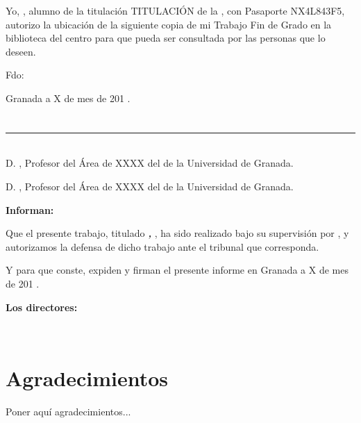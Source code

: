 Yo, \textbf{\myName}, alumno de la titulación TITULACIÓN de la \textbf{\myFaculty}, 
con Pasaporte NX4L843F5, autorizo la ubicación de la siguiente copia de mi 
Trabajo Fin de Grado en la biblioteca del centro para que pueda ser
consultada por las personas que lo deseen.

\vspace{6cm}

\noindent Fdo: \myName

\vspace{2cm}

\begin{flushright}
Granada a X de mes de 201 .
\end{flushright}


\chapter*{}

\noindent\rule[-1ex]{\textwidth}{2pt}\\[4.5ex]

D. \textbf{\myProf}, Profesor del Área de XXXX del \myDepartment de la Universidad de Granada.

\vspace{0.5cm}

D. \textbf{\myOtherProf}, Profesor del Área de XXXX del \myDepartment de la Universidad de Granada.


\vspace{0.5cm}

\textbf{Informan:}

\vspace{0.5cm}

Que el presente trabajo, titulado \textit{\textbf{\myTitle, \mySubTitle}},
ha sido realizado bajo su supervisión por \textbf{\myName}, y autorizamos la defensa de dicho trabajo ante el tribunal
que corresponda.

\vspace{0.5cm}

Y para que conste, expiden y firman el presente informe en Granada a X de mes de 201 .

\vspace{1cm}

\textbf{Los directores:}

\vspace{5cm}

\noindent \textbf{\myProf \ \ \ \ \ \myOtherProf}

\chapter*{Agradecimientos}

       \vspace{1cm}


Poner aquí agradecimientos...
